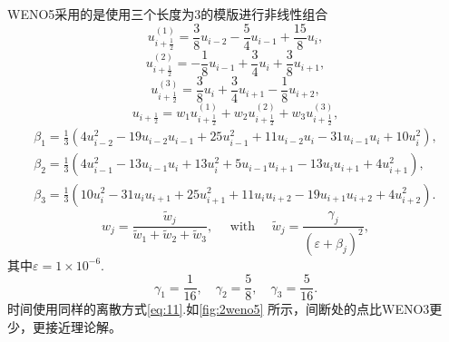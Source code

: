 \documentclass[12pt]{article}
\begin{document}
WENO5采用的是使用三个长度为3的模版进行非线性组合
\begin{equation}
	u_{i+\frac{1}{2}}^{(1)}=\frac{3}{8} u_{i-2}-\frac{5}{4} u_{i-1}+\frac{15}{8} u_{i},
\end{equation}
\begin{equation}
	u_{i+\frac{1}{2}}^{(2)}=-\frac{1}{8} u_{i-1}+\frac{3}{4} u_{i}+\frac{3}{8} u_{i+1},
\end{equation}
\begin{equation}
	u_{i+\frac{1}{2}}^{(3)}=\frac{3}{8} u_{i}+\frac{3}{4} u_{i+1}-\frac{1}{8} u_{i+2},
\end{equation}
\begin{equation}
	u_{i+\frac{1}{2}}=w_{1} u_{i+\frac{1}{2}}^{(1)}+w_{2} u_{i+\frac{1}{2}}^{(2)}+w_{3} u_{i+\frac{1}{2}}^{(3)},
\end{equation}
\begin{equation}
	\begin{aligned}
		\beta_{1}=\frac{1}{3}\left(4 u_{i-2}^{2}-19 u_{i-2} u_{i-1}+25 u_{i-1}^{2}+11 u_{i-2} u_{i}-31 u_{i-1} u_{i}+10 u_{i}^{2}\right), \\
		\beta_{2}=\frac{1}{3}\left(4 u_{i-1}^{2}-13 u_{i-1} u_{i}+13 u_{i}^{2}+5 u_{i-1} u_{i+1}-13 u_{i} u_{i+1}+4 u_{i+1}^{2}\right),   \\
		\beta_{3}=\frac{1}{3}\left(10 u_{i}^{2}-31 u_{i} u_{i+1}+25 u_{i+1}^{2}+11 u_{i} u_{i+2}-19 u_{i+1} u_{i+2}+4 u_{i+2}^{2}\right).
	\end{aligned}
\end{equation}
\begin{equation}
	w_{j}=\frac{\tilde{w}_{j}}{\tilde{w}_{1}+\tilde{w}_{2}+\tilde{w}_{3}}, \quad \text { with } \quad \tilde{w}_{j}=\frac{\gamma_{j}}{\left(\varepsilon+\beta_{j}\right)^{2}},
\end{equation}
其中$\varepsilon = 1\times 10^{-6}$.
\begin{equation}
	\gamma_{1}=\frac{1}{16}, \quad \gamma_{2}=\frac{5}{8}, \quad \gamma_{3}=\frac{5}{16}.
\end{equation}
时间使用同样的离散方式\cref{eq:11}.如\cref{fig:2weno5} 所示，间断处的点比WENO3更少，更接近理论解。
\end{document}
